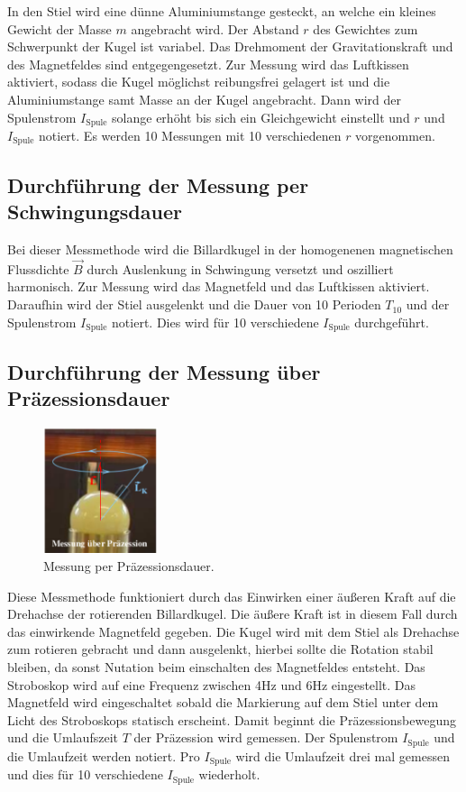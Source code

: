 In den Stiel wird eine dünne Aluminiumstange
gesteckt, an welche ein kleines Gewicht der Masse $m$ angebracht wird.
Der Abstand $r$ des Gewichtes zum Schwerpunkt der Kugel ist variabel.
Das Drehmoment der Gravitationskraft und des Magnetfeldes sind entgegengesetzt.
Zur Messung wird das Luftkissen aktiviert, sodass die Kugel möglichst
reibungsfrei gelagert ist und die Aluminiumstange samt Masse an der Kugel angebracht.
Dann wird der Spulenstrom $I_{\text{Spule}}$ solange erhöht bis sich ein Gleichgewicht einstellt und
$r$ und $I_{\text{Spule}}$ notiert. Es werden 10 Messungen mit 10 verschiedenen $r$ vorgenommen.

\subsection{Durchführung der Messung per Schwingungsdauer}
\label{ssec:DurchSchw}

Bei dieser Messmethode wird die Billardkugel in der homogenenen magnetischen Flussdichte $\vec{B}$ durch
Auslenkung in Schwingung versetzt und oszilliert harmonisch. Zur Messung wird das Magnetfeld und das Luftkissen aktiviert.
Daraufhin wird der Stiel ausgelenkt und die Dauer von 10 Perioden $T_{10}$ und der Spulenstrom $I_{\text{Spule}}$ notiert.
Dies wird für 10 verschiedene $I_{\text{Spule}}$ durchgeführt.

\subsection{Durchführung der Messung über Präzessionsdauer}
\label{ssec:DurchPraez}

\begin{figure}
  \centering
  \includegraphics[width=0.3\textwidth]{content/images/bild4.pdf}
  \caption{Messung per Präzessionsdauer.}
  \label{fig:3}
\end{figure}
Diese Messmethode funktioniert durch das Einwirken einer
äußeren Kraft auf die Drehachse der rotierenden Billardkugel.
Die äußere Kraft ist in diesem Fall durch das
einwirkende Magnetfeld gegeben.
Die Kugel wird mit dem Stiel als Drehachse zum rotieren
gebracht und dann ausgelenkt, hierbei sollte
die Rotation stabil bleiben, da sonst Nutation beim einschalten
des Magnetfeldes entsteht. Das Stroboskop wird auf eine
Frequenz zwischen 4Hz und 6Hz eingestellt.
Das Magnetfeld wird eingeschaltet sobald die Markierung auf dem
Stiel unter dem Licht des Stroboskops statisch erscheint. Damit beginnt
die Präzessionsbewegung und die Umlaufszeit $T$ der Präzession wird gemessen.
Der Spulenstrom $I_{\text{Spule}}$ und die Umlaufzeit werden notiert. Pro
$I_{\text{Spule}}$ wird die Umlaufzeit drei mal gemessen und dies für
10 verschiedene $I_{\text{Spule}}$ wiederholt.





\newpage

